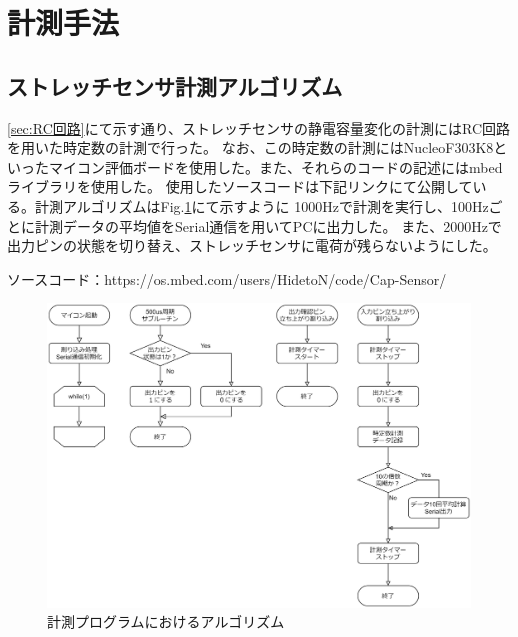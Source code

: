 \section{計測手法}
\subsection{ストレッチセンサ計測アルゴリズム}
\ref{sec:RC回路}にて示す通り、ストレッチセンサの静電容量変化の計測にはRC回路を用いた時定数の計測で行った。
なお、この時定数の計測にはNucleoF303K8といったマイコン評価ボードを使用した。また、それらのコードの記述にはmbedライブラリを使用した。
使用したソースコードは下記リンクにて公開している。計測アルゴリズムはFig.\ref{fig:algorithm}にて示すように
1000Hzで計測を実行し、100Hzごとに計測データの平均値をSerial通信を用いてPCに出力した。
また、2000Hzで出力ピンの状態を切り替え、ストレッチセンサに電荷が残らないようにした。

ソースコード：https://os.mbed.com/users/HidetoN/code/Cap-Sensor/

\begin{figure}[h]
    \begin{center}
     \includegraphics[width=0.9\columnwidth,clip]{./3_analysis/algorithm.eps}
     \caption{計測プログラムにおけるアルゴリズム}
     \label{fig:algorithm}
    \end{center}
\end{figure}

